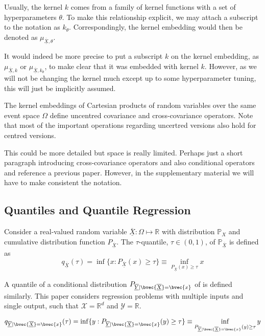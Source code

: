 \documentclass[twoside]{article} \usepackage{aistats2017}
\newcommand{\rv}[1]{\underline{\overline{#1}}}
\newcommand{\warn}[1]{{\color{red} #1}}
\begin{document}
		Usually, the kernel $k$ comes from a family of kernel functions with a set of hyperparameters $\theta$. To make this relationship explicit, we may attach a subscript to the notation as $k_{\theta}$. Correspondingly, the kernel embedding would then be denoted as $\mu_{\rv{X}, \theta}$.

		It would indeed be more precise to put a subscript $k$ on the kernel embedding, as $\mu_{\rv{X}, k}$ or $\mu_{\rv{X}, k_{\theta}}$, to make clear that it was embedded with kernel $k$. However, as we will not be changing the kernel much except up to some hyperparameter tuning, this will just be implicitly assumed.
			 
		The kernel embeddings of Cartesian products of random variables over the same event space $\Omega$ define uncentred covariance and cross-covariance operators. Note that most of the important operations regarding uncertred versions also hold for centred versions.
		 
		\warn{This could be more detailed but space is really limited. Perhaps just a short paragraph introducing cross-covariance operators and also conditional operators and reference a previous paper. However, in the supplementary material we will have to make consistent the notation.}

		
	\subsection{Quantiles and Quantile Regression}
	
		Consider a real-valued random variable $\rv{X} : \Omega \mapsto \mathbb{R}$ with distribution $\mathbb{P}_{X}$ and cumulative distribution function $P_{\rv{X}}$. The $\tau$-quantile, $\tau \in (0, 1)$, of $\mathbb{P}_{\rv{X}}$ is defined as
		\begin{equation}
			q_{\rv{X}}(\tau) = \inf\{x : P_{\rv{X}}(x) \geq \tau\} \equiv \inf_{P_{\rv{X}}(x) \geq \tau} x
		\label{eq:quantile}
		\end{equation}
		
		A quantile of a conditional distribution $P_{\rv{Y} | \bvec{\rv{X}} = \bvec{x}}$ of is defined similarly. This paper considers regression problems with multiple inputs and single output, such that $\mathcal{X} = \mathbb{R}^{d}$ and $\mathcal{Y} = \mathbb{R}$.
		
		\begin{equation}
			q_{\rv{Y} | \bvec{\rv{X}} = \bvec{x}}(\tau) = \inf\{y : P_{\rv{Y} | \bvec{\rv{X}} = \bvec{x}}(y) \geq \tau\} \equiv \inf_{P_{\rv{Y} | \bvec{\rv{X}} = \bvec{x}}(y) \geq \tau} y
		\label{eq:conditional_quantile}
		\end{equation}
		
\end{document}
